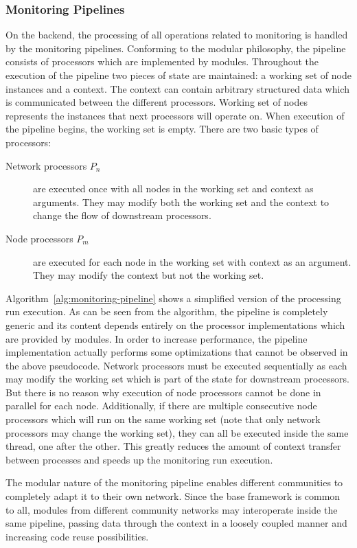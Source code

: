\documentclass[5p,sort&compress]{elsarticle}
\begin{document}
\subsubsection{Monitoring Pipelines}
On the backend, the processing of all operations related to monitoring is handled by the monitoring pipelines.
Conforming to the modular philosophy, the pipeline consists of processors which are implemented by modules.
Throughout the execution of the pipeline two pieces of state are maintained: a working set of node instances and a context.
The context can contain arbitrary structured data which is communicated between the different processors.
Working set of nodes represents the instances that next processors will operate on.
When execution of the pipeline begins, the working set is empty.
There are two basic types of processors:
\begin{description}
\item[Network processors $P_n$] are executed once with all nodes in the working set and context as arguments. They may modify both the working set and the context to change the flow of downstream processors.

\item[Node processors $P_m$] are executed for each node in the working set with context as an argument. They may modify the context but not the working set.
\end{description}

Algorithm~\ref{alg:monitoring-pipeline} shows a simplified version of the processing run execution.
As can be seen from the algorithm, the pipeline is completely generic and its content depends entirely on the processor implementations which are provided by modules.
In order to increase performance, the pipeline implementation actually performs some optimizations that cannot be observed in the above pseudocode.
Network processors must be executed sequentially as each may modify the working set which is part of the state for downstream processors.
But there is no reason why execution of node processors cannot be done in parallel for each node.
Additionally, if there are multiple consecutive node processors which will run on the same working set (note that only network processors may change the working set), they can all be executed inside the same thread, one after the other.
This greatly reduces the amount of context transfer between processes and speeds up the monitoring run execution.

The modular nature of the monitoring pipeline enables different communities to completely adapt it to their own network.
Since the base framework is common to all, modules from different community networks may interoperate inside the same pipeline, passing data through the context in a loosely coupled manner and increasing code reuse possibilities.
\end{document}
